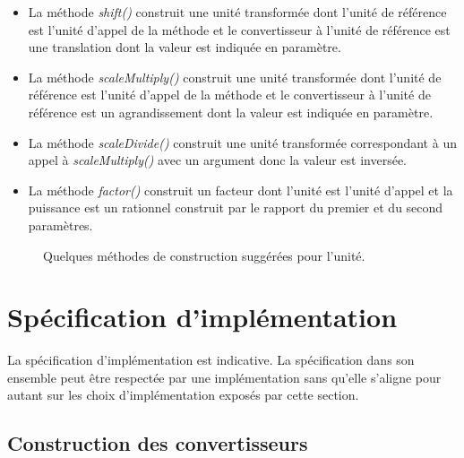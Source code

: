 \documentclass[a4paper,draft,twoside,10pt]{article}
\begin{document}
\begin{itemize}
\item La méthode \emph{shift()} construit une unité transformée dont l'unité de référence est l'unité d'appel de la
méthode et le convertisseur à l'unité de référence est une translation dont la valeur est indiquée en paramètre.
\item La méthode \emph{scaleMultiply()} construit une unité transformée dont l'unité de référence est l'unité d'appel de
la méthode et le convertisseur à l'unité de référence est un agrandissement dont la valeur est indiquée en paramètre.
\item La méthode \emph{scaleDivide()} construit une unité transformée correspondant à un appel à \emph{scaleMultiply()}
avec un argument donc la valeur est inversée.
\item La méthode \emph{factor()} construit un facteur dont l'unité est l'unité d'appel et la puissance est un rationnel
construit par le rapport du premier et du second paramètres.
\end{itemize}


\begin{figure}[!h]
\caption{Quelques méthodes de construction suggérées pour l'unité.}
\end{figure}

\section{Spécification d'implémentation}

La spécification d'implémentation est indicative. La spécification dans son ensemble peut être respectée par une
implémentation sans qu'elle s'aligne pour autant sur les choix d'implémentation exposés par cette section.

\subsection{Construction des convertisseurs}
\end{document}
